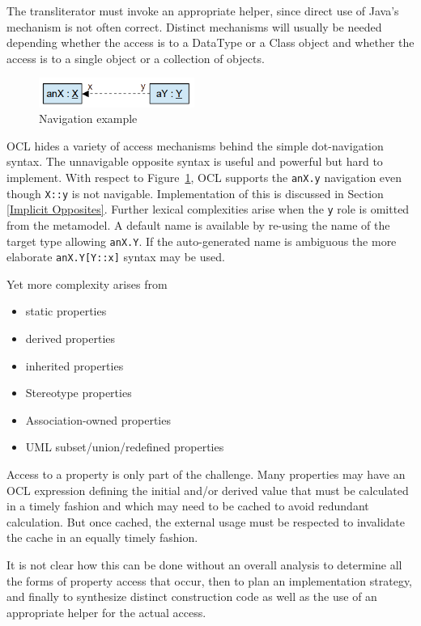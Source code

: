 \documentclass[sigconf]{acmart}
\begin{document}
The transliterator must invoke an appropriate helper, since direct use of Java's mechanism is not often correct. Distinct mechanisms will usually be needed depending whether the access is to a DataType or a Class object and whether the access is to a single object or a collection of objects.

\begin{figure}
	\includegraphics[width=2.0in]{OCLOpposite.png}
	\caption{Navigation example}
	\label{fig:navigation}
\end{figure}

OCL hides a variety of access mechanisms behind the simple dot-navigation syntax. The unnavigable opposite syntax is useful and powerful but hard to implement. With respect to Figure~\ref{fig:navigation}, OCL supports the \verb|anX.y| navigation even though \verb|X::y| is not navigable. Implementation of this is discussed in Section \ref{Implicit Opposites}.
Further lexical complexities arise when the \verb|y| role is omitted from the metamodel. A default name is available by re-using the name of the target type allowing \verb|anX.Y|. If the auto-generated name is ambiguous the more elaborate \verb|anX.Y[Y::x]| syntax may be used.

Yet more complexity arises from

\begin{itemize}
	\item static properties
	\item derived properties
	\item inherited properties
	\item Stereotype  properties
	\item Association-owned properties
	\item UML subset/union/redefined properties
\end{itemize} 

Access to a property is only part of the challenge. Many properties may have an OCL expression defining the initial and/or derived value that must be calculated in a timely fashion and which may need to be cached to avoid redundant calculation. But once cached, the external usage must be respected to invalidate the cache in an equally timely fashion.

It is not clear how this can be done without an overall analysis to determine all the forms of property access that occur, then to plan an implementation strategy, and finally to synthesize distinct construction code as well as the use of an appropriate helper for the actual access.
\end{document}
